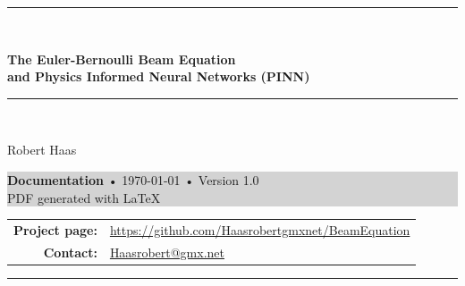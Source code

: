 \documentclass[a4paper,11pt]{article}
\begin{document}
\begin{titlepage}
    \centering

    \vspace*{1cm}
    {\color{mainblue} \rule{1.0\textwidth}{2pt}}\\[0.5cm]

    {\Huge\bfseries The Euler-Bernoulli Beam Equation\\[0.3em]
    and Physics Informed Neural Networks (PINN)\par}
    
    \vspace*{0.5cm}
    {\color{mainblue} \rule{1.0\textwidth}{2pt}}\\[1.5cm]
    
    \vspace{1cm}

    {\Large Robert Haas}\\[0.3em]

    \vspace{4cm}
    \colorbox{lightgray}{
        \parbox{0.8\textwidth}{
            \vspace{1em}
            \centering
            {\normalsize\textbf{Documentation} • \today{ }• Version 1.0}\\[0.5em]
            {\small PDF generated with \LaTeX}
            \vspace{1em}
        }
    }

    \vfill

    {\footnotesize
    \begin{tabular}{rl}
    \textbf{Project page:} & \href{https://github.com/Haasrobertgmxnet/BeamEquation}{https://github.com/Haasrobertgmxnet/BeamEquation}\\
    \textbf{Contact:} & \href{mailto:Haasrobert@gmx.net}{Haasrobert@gmx.net} \\
    \end{tabular}
    }

    \vspace{2cm}
    {\color{mainblue} \rule{1.0\textwidth}{2pt}}  %
\end{titlepage}

\pagestyle{main}
\end{document}
